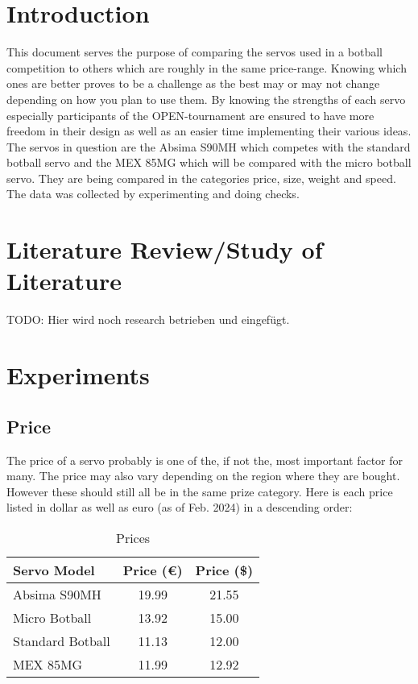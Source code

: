 \documentclass[conference]{IEEEtran}
\begin{document}
\section{Introduction}
This document serves the purpose of comparing the servos used in a botball competition to others which are roughly in the same price-range. Knowing which ones are better proves to be a challenge as the best may or may not change depending on how you plan to use them. By knowing the strengths of each servo especially participants of the OPEN-tournament are ensured to have more freedom in their design as well as an easier time implementing their various ideas. The servos in question are the Absima S90MH which competes with the standard botball servo and the MEX 85MG which will be compared with the micro botball servo. They are being compared in the categories price, size, weight and speed. The data was collected by experimenting and doing checks.

\section{Literature Review/Study of Literature}

TODO: Hier wird noch research betrieben und eingefügt.

\section{Experiments}
\subsection{Price}
The price of a servo probably is one of the, if not the, most important factor for many. The price may also vary depending on the region where they are bought. However these should still all be in the same prize category. Here is each price listed in dollar as well as euro (as of Feb. 2024) in a descending order:

\begin{table}[htbp]
\caption{Prices}
\begin{center}
\begin{tabular}{|l|c|c|}
\hline
\textbf{Servo Model} & \textbf{Price (\euro)} & \textbf{Price (\$)} \\
\hline
Absima S90MH & 19.99 & 21.55 \\
Micro Botball & 13.92 & 15.00 \\
Standard Botball & 11.13 & 12.00 \\
MEX 85MG & 11.99 & 12.92 \\
\hline
\end{tabular}
\label{tab1}
\end{center}
\end{table}
\end{document}
